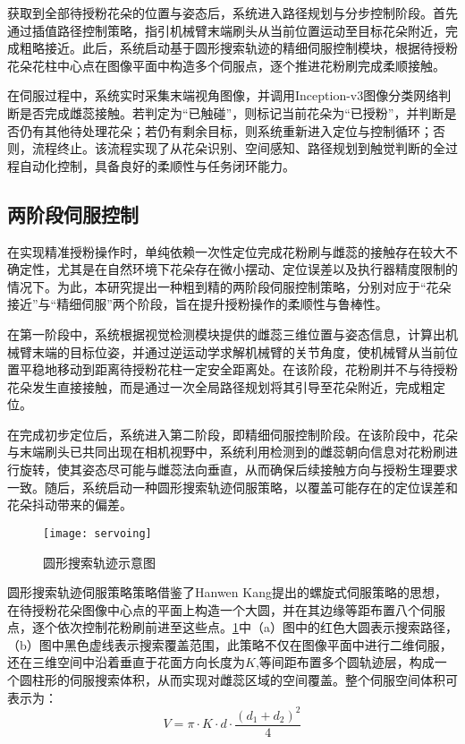 获取到全部待授粉花朵的位置与姿态后，系统进入路径规划与分步控制阶段。首先通过插值路径控制策略，指引机械臂末端刷头从当前位置运动至目标花朵附近，完成粗略接近。此后，系统启动基于圆形搜索轨迹的精细伺服控制模块，根据待授粉花朵花柱中心点在图像平面中构造多个伺服点，逐个推进花粉刷完成柔顺接触。

在伺服过程中，系统实时采集末端视角图像，并调用Inception-v3图像分类网络判断是否完成雌蕊接触。若判定为“已触碰”，则标记当前花朵为“已授粉”，并判断是否仍有其他待处理花朵；若仍有剩余目标，则系统重新进入定位与控制循环；否则，流程终止。该流程实现了从花朵识别、空间感知、路径规划到触觉判断的全过程自动化控制，具备良好的柔顺性与任务闭环能力。


\subsection{两阶段伺服控制}
在实现精准授粉操作时，单纯依赖一次性定位完成花粉刷与雌蕊的接触存在较大不确定性，尤其是在自然环境下花朵存在微小摆动、定位误差以及执行器精度限制的情况下。为此，本研究提出一种粗到精的两阶段伺服控制策略，分别对应于“花朵接近”与“精细伺服”两个阶段，旨在提升授粉操作的柔顺性与鲁棒性。

在第一阶段中，系统根据视觉检测模块提供的雌蕊三维位置与姿态信息，计算出机械臂末端的目标位姿，并通过逆运动学求解机械臂的关节角度，使机械臂从当前位置平稳地移动到距离待授粉花柱一定安全距离处。在该阶段，花粉刷并不与待授粉花朵发生直接接触，而是通过一次全局路径规划将其引导至花朵附近，完成粗定位。

在完成初步定位后，系统进入第二阶段，即精细伺服控制阶段。在该阶段中，花朵与末端刷头已共同出现在相机视野中，系统利用检测到的雌蕊朝向信息对花粉刷进行旋转，使其姿态尽可能与雌蕊法向垂直，从而确保后续接触方向与授粉生理要求一致。随后，系统启动一种圆形搜索轨迹伺服策略，以覆盖可能存在的定位误差和花朵抖动带来的偏差。


\begin{figure}[htb]
	\texttt{[image: servoing]}
	\caption[圆形搜索轨迹示意图]{圆形搜索轨迹示意图} %
	\label{fig:servoing}
\end{figure}

圆形搜索轨迹伺服策略策略借鉴了Hanwen Kang提出的螺旋式伺服策略的思想，在待授粉花朵图像中心点的平面上构造一个大圆，并在其边缘等距布置八个伺服点，逐个依次控制花粉刷前进至这些点。\cref{fig:servoing}中（a）图中的红色大圆表示搜索路径，（b）图中黑色虚线表示搜索覆盖范围，此策略不仅在图像平面中进行二维伺服，还在三维空间中沿着垂直于花面方向长度为$K$,等间距布置多个圆轨迹层，构成一个圆柱形的伺服搜索体积，从而实现对雌蕊区域的空间覆盖。整个伺服空间体积可表示为：
\begin{equation}
	\label{equ:servoing_volum}
    V = \pi \cdot K \cdot d \cdot \frac{(d_{1}+d_{2})^{2}}{4}
\end{equation}

